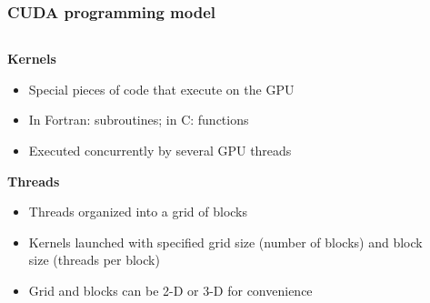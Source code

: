 \begin{frame}
\frametitle{CUDA programming model}
\pause
\begin{columns}
\begin{column}{0.5\textwidth}
\textbf{Kernels}
\begin{itemize}[<+->]
    \item Special pieces of code that execute on the GPU
    \item In Fortran: subroutines; in C: functions
    \item Executed concurrently by several GPU threads
\end{itemize}
\textbf{Threads}
\begin{itemize}[<+->]
    \item Threads organized into a grid of blocks
    \item Kernels launched with specified grid size
        (number of blocks) and block size (threads per block)
    \item Grid and blocks can be 2-D or 3-D for convenience
\end{itemize}
\end{column}
\begin{column}{0.5\textwidth}
\end{column}
\end{columns}
\end{frame}

